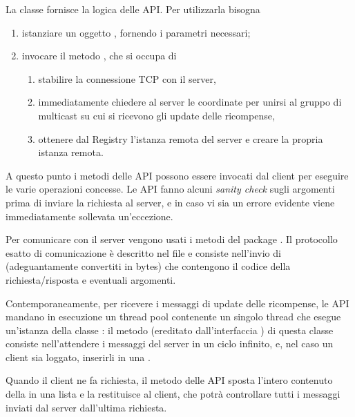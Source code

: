 \documentclass[
    oneside,
    10pt,
    language=italian,
    a4paper,
    article
]{notes}
\begin{document}
La classe  fornisce la logica delle API. Per utilizzarla bisogna
\begin{enumerate}
    \item istanziare un oggetto , fornendo i parametri necessari;
    \item invocare il metodo , che si occupa di 
    \begin{enumerate}
        \item stabilire la connessione TCP con il server,
        \item immediatamente chiedere al server le coordinate per unirsi al gruppo 
        di multicast su cui si ricevono gli update delle ricompense,
        \item ottenere dal Registry l'istanza remota del server e creare la propria
        istanza remota.
    \end{enumerate}
\end{enumerate}

A questo punto i metodi delle API possono essere invocati dal client per
eseguire le varie operazioni concesse. Le API fanno alcuni \emph{sanity check}
sugli argomenti prima di inviare la richiesta al server, e in caso vi sia un
errore evidente viene immediatamente sollevata un'eccezione.

Per comunicare con il server vengono usati i metodi del package 
. Il protocollo esatto di comunicazione è descritto nel file
 e consiste nell'invio di  (adeguantamente
convertiti in bytes) che contengono il codice della richiesta/risposta e eventuali
argomenti.

Contemporaneamente, per ricevere i messaggi di update delle ricompense, le API
mandano in esecuzione un thread pool contenente un singolo thread che esegue 
un'istanza della classe : il metodo 
(ereditato dall'interfaccia ) di questa classe consiste
nell'attendere i messaggi del server in un ciclo infinito, e, nel caso un client
sia loggato, inserirli in una .

Quando il client ne fa richiesta, il metodo  delle
API sposta l'intero contenuto della  in una lista e la
restituisce al client, che potrà controllare tutti i messaggi inviati dal server
dall'ultima richiesta.
\end{document}
